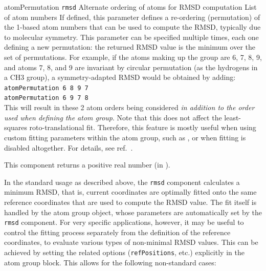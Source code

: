 \begin{cvcoptions}
\item %
  \key
    {atomPermutation}{%
    \texttt{rmsd}}{%
    Alternate ordering of atoms for RMSD computation}{%
    List of atom numbers}{%
    If defined, this parameter defines a re-ordering (permutation) of the 1-based atom numbers that
    can be used to compute the RMSD, typically due to molecular symmetry.
    This parameter can be specified multiple times, each one defining a new permutation:
    the returned RMSD value is the minimum over the set of permutations.
    For example, if the atoms making up the group are 6, 7, 8, 9, and atoms 7, 8, and 9
    are invariant by circular permutation (as the hydrogens in a CH3 group), a
    symmetry-adapted RMSD would be obtained by adding:\\
    \texttt{atomPermutation 6 8 9 7}\\
    \texttt{atomPermutation 6 9 7 8}\\
    This will result in these 2 atom orders being considered \emph{in addition to the order used when defining the atom group}.
    Note that this does not affect the least-squares roto-translational fit.
    Therefore, this feature is mostly useful when using custom fitting parameters within the
    atom group, such as , or when fitting
    is disabled altogether. For details, see ref.\ \citealp{Ebrahimi2022}.
  }
\end{cvcoptions}
This component returns a positive real number (in \lengthunit).


In the standard usage as described above, the \texttt{rmsd} component
calculates a minimum RMSD, that is, current coordinates are optimally
fitted onto the same reference coordinates that are used to
compute the RMSD value. The fit itself is handled by the atom group
object, whose parameters are automatically set by the \texttt{rmsd}
component.
For very specific applications, however, it may be
useful to control the fitting process separately from the definition
of the reference coordinates, to evaluate various types of
non-minimal RMSD values. This can be achieved by setting the
related options (\texttt{refPositions}, etc.) explicitly in the
atom group block. This allows for the following non-standard cases:

